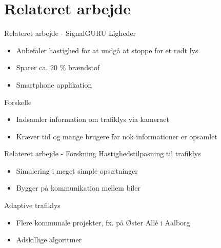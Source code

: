 \section{Relateret arbejde}
\begin{frame}{Relateret arbejde - SignalGURU}
Ligheder
\begin{itemize}
	\item Anbefaler hastighed for at undgå at stoppe for et rødt lys
	\item Sparer ca. 20 \% brændstof
	\item Smartphone applikation
\end{itemize}
\vspace{5mm}
Forskelle
\begin{itemize}
	\item Indsamler information om trafiklys via kameraet
	\item Kræver tid og mange brugere før nok informationer er opsamlet
\end{itemize}
\vspace{5mm}
\end{frame}

\begin{frame}{Relateret arbejde - Forskning}
Hastighedstilpasning til trafiklys
\begin{itemize}
	\item Simulering i meget simple opsætninger
	\item Bygger på kommunikation mellem biler
\end{itemize}

\vspace{5mm}
Adaptive trafiklys
\begin{itemize}
	\item Flere kommunale projekter, fx. på Øster Allé i Aalborg
	\item Adskillige algoritmer
\end{itemize}
\end{frame}
